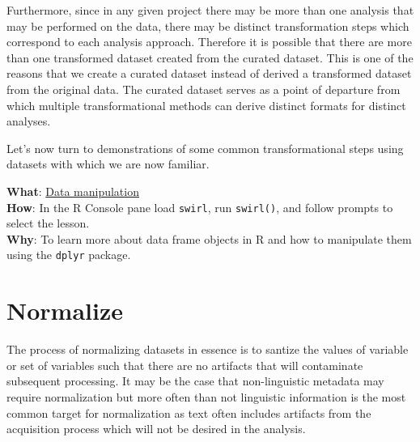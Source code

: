 \documentclass[
  letterpaper,
]{latex/krantz}
\begin{document}
Furthermore, since in any given project there may be more than one
analysis that may be performed on the data, there may be distinct
transformation steps which correspond to each analysis approach.
Therefore it is possible that there are more than one transformed
dataset created from the curated dataset. This is one of the reasons
that we create a curated dataset instead of derived a transformed
dataset from the original data. The curated dataset serves as a point of
departure from which multiple transformational methods can derive
distinct formats for distinct analyses.

Let's now turn to demonstrations of some common transformational steps
using datasets with which we are now familiar.

\begin{tcolorbox}[enhanced jigsaw, toprule=.15mm, bottomtitle=1mm, coltitle=black, title=\textcolor{quarto-callout-tip-color}{\faLightbulb}\hspace{0.5em}{Swirl}, left=2mm, colframe=quarto-callout-tip-color-frame, bottomrule=.15mm, colbacktitle=quarto-callout-tip-color!10!white, leftrule=.75mm, colback=white, titlerule=0mm, breakable, toptitle=1mm, opacityback=0, arc=.35mm, rightrule=.15mm, opacitybacktitle=0.6]

\textbf{What}: \href{https://github.com/lin380/swirl}{Data
manipulation}\\
\textbf{How}: In the R Console pane load \texttt{swirl}, run
\texttt{swirl()}, and follow prompts to select the lesson.\\
\textbf{Why}: To learn more about data frame objects in R and how to
manipulate them using the \texttt{dplyr} package.

\end{tcolorbox}

\hypertarget{normalize}{%
\section{Normalize}\label{normalize}}

The process of normalizing datasets in essence is to santize the values
of variable or set of variables such that there are no artifacts that
will contaminate subsequent processing. It may be the case that
non-linguistic metadata may require normalization but more often than
not linguistic information is the most common target for normalization
as text often includes artifacts from the acquisition process which will
not be desired in the analysis.
\end{document}
